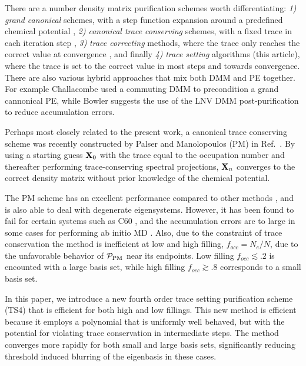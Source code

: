 \commentoutA{\documentclass[prb,aps,twocolumn,twocolumngrid,secnumarabic,superbib,hyperref]{revtex4}}
\begin{document}
There are a number density matrix purification schemes worth differentiating: 
{\it 1)} {\it grand canonical} schemes, with a step function  expansion around a predefined 
         chemical potential \cite{McWeeny60,Kryachko,Holas},
{\it 2)} {\it canonical trace conserving} schemes, with a fixed trace
         in each iteration step \cite{Palser98}, 
{\it 3)} {\it trace correcting} methods, where the trace only reaches the correct value at 
         convergence \cite{Niklasson02b}, and finally 
{\it 4)} {\it trace setting} algorithms (this article), where the 
         trace is set to the correct value in most steps and towards convergence.
There are also various hybrid approaches that mix both DMM and PE together.  For example
Challacombe\cite{MChallacombe00} used a commuting DMM to precondition a grand cannonical PE,
while Bowler \cite{DBowler00} suggests the use of the LNV DMM post-purification to reduce 
accumulation errors.

Perhaps most closely related to the present work, a canonical trace 
conserving  scheme was recently constructed by Palser and Manolopoulos 
(PM) in Ref.~. By using a starting guess ${\bf X}_0$ with the trace equal to 
the occupation number and thereafter performing trace-conserving
spectral projections, ${\bf X}_n$ converges to the correct density matrix without
prior knowledge of the chemical potential. 

The PM scheme has an excellent
performance compared to other methods \cite{JDaniels99,XPalser98}, and is also
able to deal with degenerate eigensystems.   However, it has been found
to fail for certain systems such as C60 \cite{JDaniels99}, and the accumulation
errors are to large in some cases for performing ab initio MD \cite{DBowler00}.
Also, due to the constraint of trace conservation the method is inefficient at low 
and high filling, $f_{occ}=N_e/N$, due to the unfavorable behavior of ${\cal P}_{\rm PM}$ near 
its endpoints.  Low filling $f_{occ}\lesssim .2$  is encounted 
with a large basis set, while high filling $f_{occ} \gtrsim .8$ corresponds to a small basis set.

In this paper, we introduce a new fourth order trace setting purification scheme (TS4) 
that is efficient for both high and low fillings.  This new method is 
efficient because it employs a polynomial that is uniformly well behaved, but with the
potential for violating trace conservation in intermediate steps.  The method
converges more rapidly for both small and large basis sets, significantly reducing 
threshold induced blurring of the eigenbasis in these cases.
\end{document}
